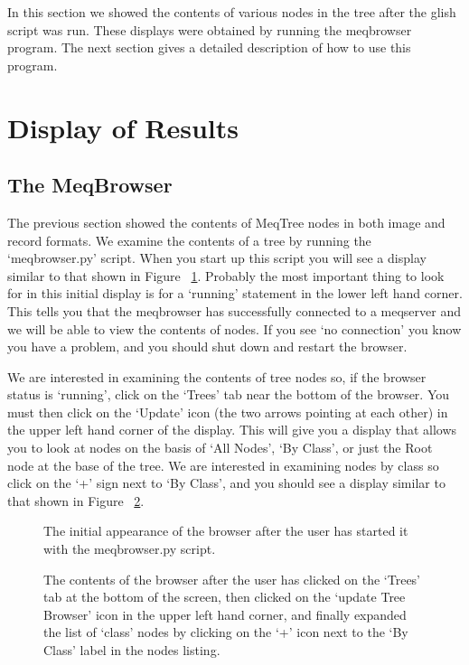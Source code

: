 \documentclass[10pt]{article}
\begin{document}
In this section we showed the contents of various nodes in the 
tree after the glish script was run. These displays were obtained
by running the meqbrowser program. The next section gives a detailed
description of how to use this program.

\section{Display of Results}

\subsection {The MeqBrowser}

The previous section showed the contents of MeqTree nodes in both 
image and record formats. We examine the contents of a tree
by running the `meqbrowser.py' script. When you start up this script
you will see a display similar to that shown in 
Figure  ~\ref{fig:browser1}. Probably the most important thing to
look for in this initial display is for a `running' statement in the
lower left hand corner. This tells you that the meqbrowser has
successfully connected to a meqserver and we will be able to view
the contents of nodes. If you see `no connection' you know you have a
problem, and you should shut down and restart the browser.

We are interested in examining the contents of tree nodes so, if the
browser status is `running', click on the `Trees' tab near the
bottom of the browser. You must then click on the `Update' icon
(the two arrows pointing at each other) in the upper left hand
corner of the display. This will give you a display that allows you
to look at nodes on the basis of `All Nodes', `By Class', or just 
the Root node at the base of the tree. 
We are interested in examining nodes by class so click
on the `+' sign next to `By Class', and you should see a display
similar to that shown in Figure  ~\ref{fig:browser2}. 

\begin{figure}
{\par\centering
{}
\par}
\caption {The initial appearance of the browser after the user has 
started it with the meqbrowser.py script.}
\label{fig:browser1}
\end{figure}

\begin{figure}
{\par\centering
{}
\par}
\caption {The contents of the browser after the user has clicked on the
`Trees' tab at the bottom of the screen, then clicked on the 
`update Tree Browser' icon in the upper left hand corner, and finally
expanded the list of `class' nodes by clicking on the `+' icon next to
the `By Class' label in the nodes listing.}
\label{fig:browser2}
\end{figure}
\end{document}
